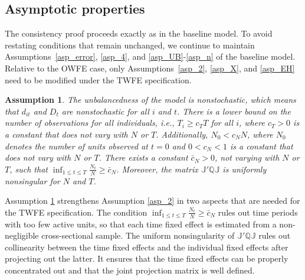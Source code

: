 \documentclass[11pt,a4paper]{article}
\newtheorem{passumption}{Assumption}
\begin{document}



\subsection{Asymptotic properties}
The consistency proof proceeds exactly as in the baseline model. To avoid restating conditions that remain unchanged, we continue to maintain Assumptions~\ref{asp_error}, \ref{asp_4}, and \ref{asp_UB}-\ref{asp_n} of the baseline model. Relative to the OWFE case, only Assumptions~\ref{asp_2}, \ref{asp_X}, and \ref{asp_EH} need to be modified under the TWFE specification.

\setcounter{passumption}{0}
\begin{passumption}\label{ass:1prime}
The unbalancedness of the model is nonstochastic, which means that $d_{it}$ and $D_t$ are nonstochastic for all $i$ and $t$. There is a lower bound on the number of observations for all individuals, i.e., $T_i \ge c_T T$ for all $i$, where $c_T > 0$ is a constant that does not vary with $N$ or $T$. Additionally, $N_0 < c_N N$, where $N_0$ denotes the number of units observed at $t=0$ and $0 < c_N < 1$ is a constant that does not vary with $N$ or $T$. There exists a constant $\bar c_N > 0$, not varying with $N$ or $T$, such that $\inf_{1\le t\le T}\frac{N_t}{N}\ge \bar c_N$. Moreover, the matrix \(\mathbb J'\mathbb Q\mathbb J\) is uniformly nonsingular for \(N\) and \(T\).
\end{passumption}

Assumption \ref{ass:1prime} strengthens Assumption \ref{asp_2} in two aspects that are needed for the TWFE specification. The condition \(\inf_{1\le t\le T} \frac{N_t}{N}\ge \bar c_N\) rules out time periods with too few active units, so that each time fixed effect is estimated from a non-negligible cross-sectional sample. The uniform nonsingularity of \(\mathbb{J}'\mathbb{Q}\mathbb{J}\) rules out collinearity between the time fixed effects and the individual fixed effects after projecting out the latter. It ensures that the time fixed effects can be properly concentrated out and that the joint projection matrix is well defined.
\end{document}
